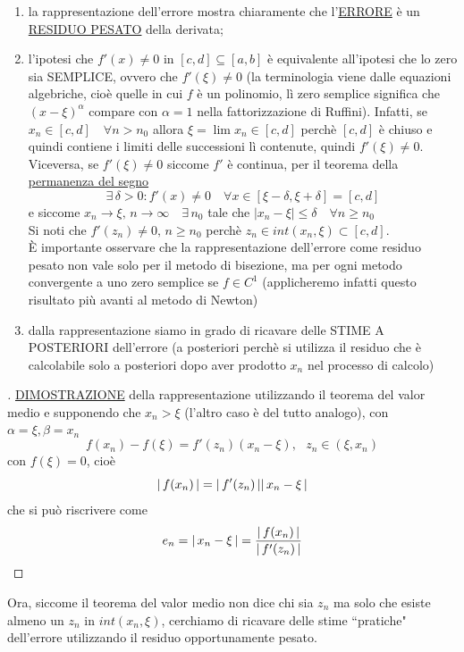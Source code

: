 \documentclass[12pt]{article}
\DeclarePairedDelimiter{\abs}{\lvert}{\rvert}
\begin{document}
\begin{enumerate}
    \item la rappresentazione dell'errore mostra chiaramente che l'\uline{ERRORE} è un \uline{RESIDUO PESATO} della derivata;
    \item l'ipotesi che $f'(x)\ne0$ in $[c,d]\subseteq [a,b]$ è equivalente all'ipotesi che lo zero sia SEMPLICE, ovvero che $f'(\xi)\ne 0$ (la terminologia viene dalle equazioni algebriche, cioè quelle in cui $f$ è un polinomio, lì zero semplice significa che $(x-\xi)^{\alpha}$ compare con $\alpha =1$ nella fattorizzazione di Ruffini). Infatti, se $x_n\in [c,d]\quad \forall n>n_0$ allora $\xi=\lim x_n\in [c,d]$ perchè $[c,d]$ è chiuso e quindi contiene i limiti delle successioni lì contenute, quindi $f'(\xi)\ne 0$.
    Viceversa, se $f'(\xi)\ne 0$ siccome $f'$ è continua, per il teorema della \uline{permanenza del segno}
    \[\exists\, \delta>0 : f'(x)\ne 0\quad \forall x \in [\xi - \delta, \xi + \delta] = [c,d]\]
    e siccome $x_n \to \xi,\,n \to \infty\quad \exists \,n_0$ tale che $|x_n-\xi|\le \delta \quad \forall n \ge n_0$\\
    Si noti che $f'(z_n)\ne 0,\, n\ge n_0$ perchè $z_n \in int(x_n,\xi)\subset[c,d]$.\\
    È importante osservare che la rappresentazione dell'errore come residuo pesato non vale solo per il metodo di bisezione, ma per ogni metodo convergente a uno zero semplice se $f\in C^1$ (applicheremo infatti questo risultato più avanti al metodo di Newton)
    \item dalla rappresentazione siamo in grado di ricavare delle STIME A POSTERIORI dell'errore (a posteriori perchè si utilizza il residuo che è calcolabile solo a posteriori dopo aver prodotto $x_n$ nel processo di calcolo)
\end{enumerate}
\begin{proof}[\unskip\nopunct]
\uline{DIMOSTRAZIONE} della rappresentazione utilizzando il teorema del valor medio e supponendo che $x_n>\xi$ (l'altro caso è del tutto analogo), con $\alpha=\xi, \beta=x_n$
\[ f(x_n)-f(\xi) = f'(z_n)(x_n-\xi), \text{ } z_n \in (\xi,x_n)\]
con $f(\xi)=0$, cioè
\[ \abs{\,f(x_n)\,} = \abs{\,f'(z_n)\,}\abs{\,x_n-\xi\,} \]
che si può riscrivere come
\[ e_n = \abs{\,x_n-\xi\,} = \frac{\abs{\,f(x_n)\,}}{\abs{\,f'(z_n)\,}} \]
\end{proof}

Ora, siccome il teorema del valor medio non dice chi sia $z_n$ ma solo che esiste almeno un $z_n$ in $int(x_n,\xi)$, cerchiamo di ricavare delle stime ``pratiche" dell'errore utilizzando il residuo opportunamente pesato.
\end{document}
